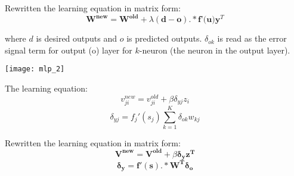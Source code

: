 \begin{multicols}{2}
\noindent Rewritten the learning equation in matrix form:
$$\mathbf{W^{new}} = \mathbf{W^{old}} + \lambda (\mathbf{d}-\mathbf{o}).* \textbf{f'(u)} \mathbf{y}^T$$

\noindent where $d$ is desired outputs and $o$ is predicted outputs. $\delta_{ok}$ is read as the error signal term for output (o) layer for $k$-neuron (the neuron in the output layer). 

\begin{center}
\texttt{[image: mlp\_2]}
\end{center}

\noindent The learning equation:
$$v_{ji}^{new} = v_{ji}^{old} + \beta \delta_{yj} z_i$$
$$\delta_{yj} = f_j'(s_j)\sum_{k=1}^{K} \delta_{ok} w_{kj}$$

\noindent Rewritten the learning equation in matrix form:
$$\mathbf{V^{new} = V^{old}} + \beta \mathbf{\delta_y z^{T}}$$
$$\mathbf{\delta_y = f'(s) .* W^{T} \delta_o}$$

\end{multicols}